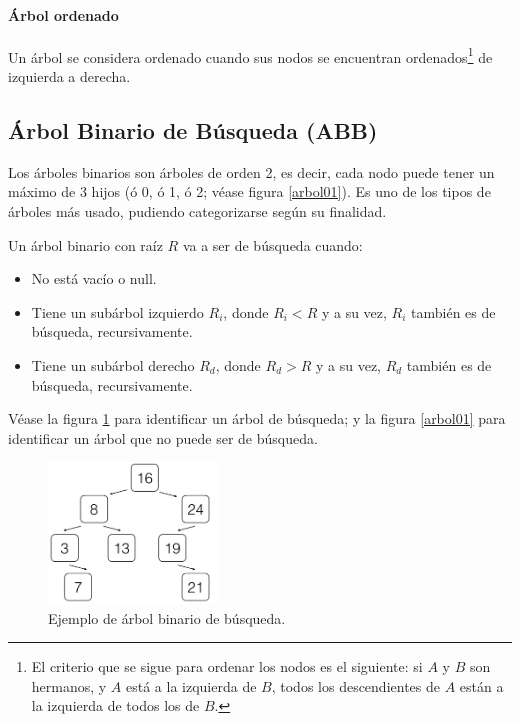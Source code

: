 \documentclass[a4paper, 11pt, titlepage]{article}
\begin{document}
        \paragraph{Árbol ordenado} Un árbol se considera ordenado cuando sus nodos se encuentran 
        ordenados\footnote{
            El criterio que se sigue para ordenar los nodos es el siguiente: si $A$ y $B$ son hermanos,
            y $A$ está a la izquierda de $B$, todos los descendientes de $A$ están a la izquierda de todos
            los de $B$.
        } de izquierda a derecha.

    \subsection{Árbol Binario de Búsqueda (ABB)}

        Los árboles binarios son árboles de orden 2, es decir, cada nodo puede tener un máximo de 
        3 hijos (ó 0, ó 1, ó 2; véase figura \ref{arbol01}). Es uno de los tipos de árboles más usado, 
        pudiendo categorizarse según su finalidad.

        Un árbol binario con raíz $R$ va a ser de búsqueda cuando:

        \begin{itemize}
            \item No está vacío o null.
            \item Tiene un subárbol izquierdo $R_i$, donde $R_i < R$ y a su vez, $R_i$ también es
            de búsqueda, recursivamente.
            \item Tiene un subárbol derecho $R_d$, donde $R_d > R$ y a su vez, $R_d$ también es
            de búsqueda, recursivamente.
        \end{itemize}

        Véase la figura \ref{arbol02} para identificar un árbol de búsqueda; y la figura 
        \ref{arbol01} para identificar un árbol que no puede ser de búsqueda.

        \begin{figure}[htp]
            \centering
            \includegraphics[width=0.4\textwidth]{resources/arbol02.png}
            \caption{Ejemplo de árbol binario de búsqueda.}
            \label{arbol02}
        \end{figure}
\end{document}
